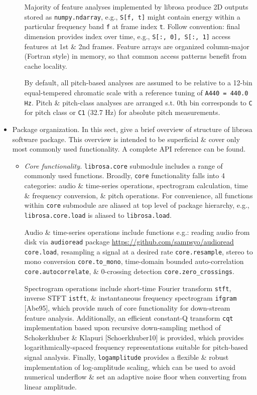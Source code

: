 \documentclass{article}
\begin{document}
\begin{itemize}
\begin{itemize}
		Majority of feature analyses implemented by librosa produce 2D outputs stored as {\tt numpy.ndarray}, e.g., {\tt S[f, t]} might contain energy within a particular frequency band {\tt f} at frame index {\tt t}. Follow convention: final dimension provides index over time, e.g., {\tt S[:, 0], S[:, 1]} access features at 1st \& 2nd frames. Feature arrays are organized column-major (Fortran style) in memory, so that common access patterns benefit from cache locality.
		
		By default, all pitch-based analyses are assumed to be relative to a 12-bin equal-tempered chromatic scale with a reference tuning of {\tt A440 = 440.0 Hz}. Pitch \& pitch-class analyses are arranged s.t. 0th bin corresponds to {\tt C} for pitch class or {\tt C1} (32.7 Hz) for absolute pitch measurements.
	\end{itemize}
	\item {\sf Package organization.} In this sect, give a brief overview of structure of librosa software package. This overview is intended to be superficial \& cover only most commonly used functionality. A complete API reference can be found.
	\begin{itemize}
		\item {\it Core functionality.} {\tt librosa.core} submodule includes a range of commonly used functions. Broadly, {\tt core} functionality falls into 4 categories: audio \& time-series operations, spectrogram calculation, time \& frequency conversion, \& pitch operations. For convenience, all functions within {\tt core} submodule are aliased at top level of package hierarchy, e.g., {\tt librosa.core.load} is aliased to {\tt librosa.load}.
		
		Audio \& time-series operations include functions e.g.: reading audio from disk via {\tt audioread} package \url{https://github.com/sampsyo/audioread} {\tt core.load}, resampling a signal at a desired rate {\tt core.resample}, stereo to mono conversion \verb|core.to_mono|, time-domain bounded auto-correlation {\tt core.autocorrelate}, \& 0-crossing detection \verb|core.zero_crossings|.
		
		Spectrogram operations include short-time Fourier transform {\tt stft}, inverse STFT {\tt istft}, \& instantaneous frequency spectrogram {\tt ifgram} [Abe95], which provide much of core functionality for down-stream feature analysis. Additionally, an efficient constant-Q transform {\tt cqt} implementation based upon recursive down-sampling method of 
		{\sc Schokerkhuber \& Klapuri} [Schoerkhuber10] is provided, which provides logarithmically-spaced frequency representations suitable for pitch-based signal analysis. Finally, {\tt logamplitude} provides a flexible \& robust implementation of log-amplitude scaling, which can be used to avoid numerical underflow \& set an adaptive noise floor when converting from linear amplitude.
		

\end{itemize}
\end{itemize}
\end{document}
